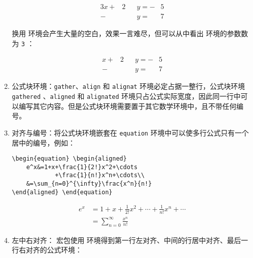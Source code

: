 \begin{enumerate}
\begin{tcolorbox}[sidebyside]
\begin{alignat*}{3}
    x+&2&&y=-&5\\
     -& &&y= &7
\end{alignat*}
\end{tcolorbox}

换用  环境会产生大量的空白，效果一言难尽，但可以从中看出  环境的参数数为 \verb|3| ：

\begin{tcolorbox}[colback=white]
\vspace{-1em}
\begin{align*}
    x+&2&&y=-&5\\
     -& &&y= &7
\end{align*}
\end{tcolorbox}

\item 公式块环境：\verb|gather|、\verb|align| 和 \verb|alignat| 环境必定占据一整行，公式块环境 \verb|gathered| 、\verb|aligned| 和 \verb|alignated| 环境只占公式实际宽度，因此同一行中可以编写其它内容。但是公式块环境需要置于其它数学环境中，且不带任何编号。

\item 对齐与编号：将公式块环境嵌套在 \verb|equation| 环境中可以使多行公式只有一个居中的编号，例如：

\begin{tcolorbox}[sidebyside]
\begin{lstlisting}
\begin{equation} \begin{aligned}
    e^x&=1+x+\frac{1}{2!}x^2+\cdots
            +\frac{1}{n!}x^n+\cdots\\
    &=\sum_{n=0}^{\infty}\frac{x^n}{n!}
\end{aligned} \end{equation}
\end{lstlisting} 

\tcblower

\begin{equation}
    \begin{aligned}
        e^x&=1+x+\frac{1}{2!}x^2+\cdots+\frac{1}{n!}x^n+\cdots\\
        &=\sum_{n=0}^{\infty}\frac{x^n}{n!}
    \end{aligned}
\end{equation}
\end{tcolorbox}

\item 左中右对齐： 宏包使用  环境得到第一行左对齐、中间的行居中对齐、最后一行右对齐的公式环境：


\end{enumerate}
